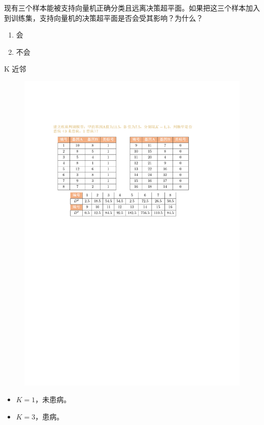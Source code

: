 \begin{example}
    现有三个样本能被支持向量机正确分类且远离决策超平面。如果把这三个样本加入到训练集，支持向量机的决策超平面是否会受其影响？为什么？
    \begin{enumerate}[A]
        \item 会
        \item \textcolor{main1}{不会}
    \end{enumerate}
\end{example}
\textcolor{main1}{K 近邻}
\begin{figure}[htbp]
    \centering
    \includegraphics[scale = 0.95]{image/K近邻.pdf}
\end{figure}
\begin{itemize}
    \item $K = 1$，未患病。
    \item $K = 3$，患病。
\end{itemize}
